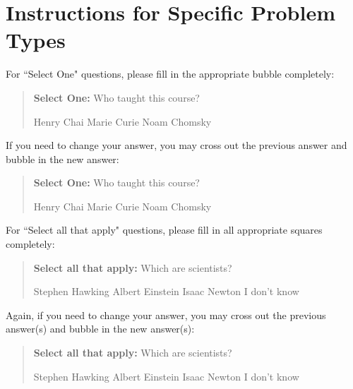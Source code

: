 \documentclass[11pt,addpoints,answers]{exam}
\newcommand{\blackcircle}{\tikz\draw[black,fill=black] (0,0) circle (1ex);}
\begin{document}
\begin{itemize}
\end{itemize}\clearpage

\section*{Instructions for Specific Problem Types}

For ``Select One" questions, please fill in the appropriate bubble completely:

\begin{quote}
\textbf{Select One:} Who taught this course?
    \begin{checkboxes}
     \CorrectChoice Henry Chai
     \choice Marie Curie
     \choice Noam Chomsky
    \end{checkboxes}
\end{quote}

If you need to change your answer, you may cross out the previous answer and bubble in the new answer:

\begin{quote}
\textbf{Select One:} Who taught this course?
    {
    \begin{checkboxes}
     \CorrectChoice Henry Chai
     \choice Marie Curie \checkboxchar{\xcancel{\blackcircle}{}}
     \choice Noam Chomsky
    \end{checkboxes}
    }
\end{quote}

For ``Select all that apply" questions, please fill in all appropriate squares completely:

\begin{quote}
\textbf{Select all that apply:} Which are scientists?
    {%
    \checkboxchar{$\Box$} \checkedchar{$\blacksquare$} %
    \begin{checkboxes}
    \CorrectChoice Stephen Hawking 
    \CorrectChoice Albert Einstein
    \CorrectChoice Isaac Newton
    \choice I don't know
    \end{checkboxes}
    }
\end{quote}

Again, if you need to change your answer, you may cross out the previous answer(s) and bubble in the new answer(s):

\begin{quote}
\textbf{Select all that apply:} Which are scientists?
    {%
    \checkboxchar{\xcancel{$\blacksquare$}} \checkedchar{$\blacksquare$} %
    \begin{checkboxes}
    \CorrectChoice Stephen Hawking 
    \CorrectChoice Albert Einstein
    \CorrectChoice Isaac Newton
    \choice I don't know
    \end{checkboxes}
    }
\end{quote}
\end{document}
